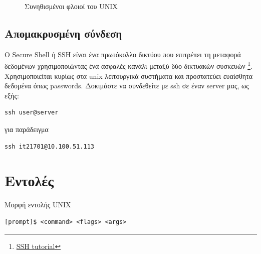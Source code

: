 \begin{figure}[h]
	\centering
	\caption{Συνηθισμένοι φλοιοί του UNIX}
	\label{os_shells}
\end{figure} 

\subsection{Απομακρυσμένη σύνδεση}

Ο Secure Shell ή SSH είναι ένα πρωτόκολλο δικτύου που επιτρέπει τη μεταφορά δεδομένων χρησιμοποιώντας ένα ασφαλές κανάλι μεταξύ δύο δικτυακών συσκευών \footnote{\href{https://support.suso.com/supki/SSH\_Tutorial\_for\_Linux}{SSH tutorial}}. 
	Χρησιμοποιείται κυρίως στα unix λειτουργικά συστήματα και προστατεύει ευαίσθητα δεδομένα όπως passwords. Δοκιμάστε να συνδεθείτε με ssh σε έναν server μας, ως εξής:
\begin{lstlisting}
ssh user@server
\end{lstlisting}
για παράδειγμα 
\begin{lstlisting}
ssh it21701@10.100.51.113
\end{lstlisting}

\section{Εντολές}

Μορφή εντολής UNIX
\begin{lstlisting}
[prompt]$ <command> <flags> <args>
\end{lstlisting}


